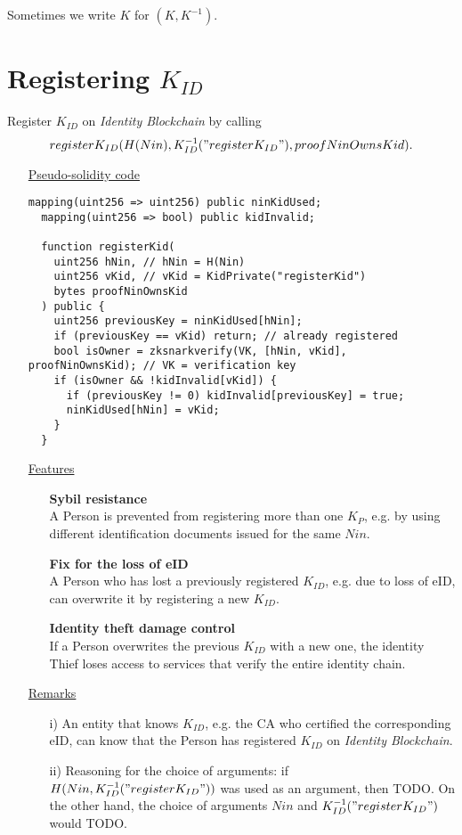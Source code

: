 \documentclass{article}
\newcommand{\khk}{K_{P}}
\newcommand{\kid}{K_{ID}}
\newcommand{\pbc}{\textit{Identity Blockchain}}
\begin{document}
Sometimes we write $K$ for $(K, K^{-1})$.

\newpage
\section{Registering $\kid$}
Register $\kid$ on \pbc{} by calling $$register\kid(H(Nin), \kid^{-1}("register\kid"), proofNinOwnsKid).$$
\begin{enumerate}[leftmargin=0cm]
\item[] \underline{Pseudo-solidity code}

\hfill\begin{minipage}{\dimexpr\textwidth-20px}
\begin{lstlisting}[language=Solidity]
  mapping(uint256 => uint256) public ninKidUsed;
  mapping(uint256 => bool) public kidInvalid;

  function registerKid(
    uint256 hNin, // hNin = H(Nin)
    uint256 vKid, // vKid = KidPrivate("registerKid")
    bytes proofNinOwnsKid
  ) public {
    uint256 previousKey = ninKidUsed[hNin];
    if (previousKey == vKid) return; // already registered
    bool isOwner = zksnarkverify(VK, [hNin, vKid], proofNinOwnsKid); // VK = verification key
    if (isOwner && !kidInvalid[vKid]) {
      if (previousKey != 0) kidInvalid[previousKey] = true;
      ninKidUsed[hNin] = vKid;
    }
  }
\end{lstlisting}
\xdef\tpd{\the\prevdepth}
\end{minipage}
\item[] \underline{Features}
    \begin{itemize}
      \item[] \textbf{Sybil resistance} \\ A Person is prevented from registering more than one $\khk$, e.g. by using different identification documents issued for the same $Nin$.
          \vspace{5px}
      \item[] \textbf{Fix for the loss of eID} \\ A Person who has lost a previously registered $\kid$, e.g. due to loss of eID, can overwrite it by registering a new $\kid$.
          \vspace{5px}
      \item[] \textbf{Identity theft damage control} \\ If a Person overwrites the previous $\kid$ with a new one, the identity Thief loses access to services that verify the entire identity chain.
    \end{itemize}

\item[] \underline{Remarks}
\begin{itemize}
\item[i)] An entity that knows $\kid$, e.g. the CA who certified the corresponding eID, can know that the Person has registered $\kid$ on \pbc{}.
\item[ii)] Reasoning for the choice of arguments: if $H(Nin, \kid^{-1}("register\kid"))$ was used as an argument, then TODO. On the other hand, the choice of arguments $Nin$ and $\kid^{-1}("register\kid")$ would TODO.
\end{itemize}
\end{enumerate}
\end{document}

